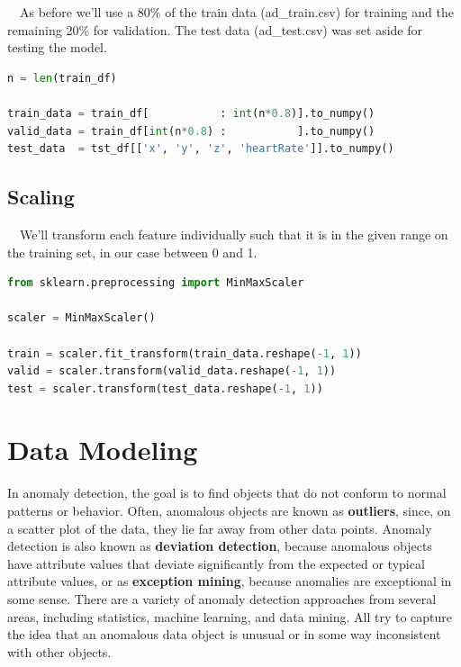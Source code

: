 ~~As before we'll use a 80\% of the train data (ad\_train.csv) for training and the remaining 20\% for validation. The test data (ad\_test.csv) was set aside for testing the model.

\begin{lstlisting}[language=Python]
n = len(train_df)

train_data = train_df[           : int(n*0.8)].to_numpy()
valid_data = train_df[int(n*0.8) :           ].to_numpy()
test_data  = tst_df[['x', 'y', 'z', 'heartRate']].to_numpy()
\end{lstlisting}





\subsection*{Scaling}\label{Scaling}

~~We'll transform each feature individually such that it is in the given range on the training set, in our case between 0 and 1. 

\begin{lstlisting}[language=Python]
from sklearn.preprocessing import MinMaxScaler

scaler = MinMaxScaler()

train = scaler.fit_transform(train_data.reshape(-1, 1))
valid = scaler.transform(valid_data.reshape(-1, 1))
test = scaler.transform(test_data.reshape(-1, 1))
\end{lstlisting}





\section*{Data Modeling}\label{Data Modeling}

In anomaly detection, the goal is to ﬁnd objects that do not conform to normal patterns or behavior. Often, anomalous objects are known as \textbf{outliers}, since, on a scatter plot of the data, they lie far away from other data points. Anomaly detection is also known as \textbf{deviation detection}, because anomalous objects have attribute values that deviate signiﬁcantly from the expected or typical attribute values, or as \textbf{exception mining}, because anomalies are exceptional in some sense. There are a variety of anomaly detection approaches from several areas, including statistics, machine learning, and data mining. All try to capture the idea that an anomalous data object is unusual or in some way inconsistent with other objects.


